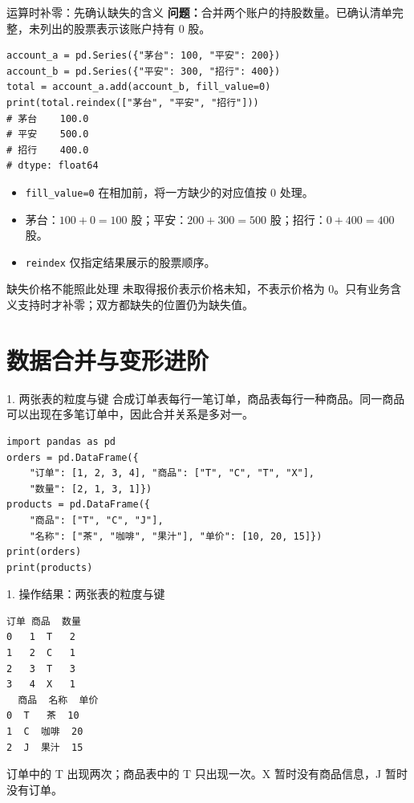 \documentclass[9pt]{ctexbeamer}
\begin{document}
\begin{frame}[fragile]{运算时补零：先确认缺失的含义}
\small \textbf{问题：}合并两个账户的持股数量。已确认清单完整，未列出的股票表示该账户持有 0 股。
\begin{lstlisting}
account_a = pd.Series({"茅台": 100, "平安": 200})
account_b = pd.Series({"平安": 300, "招行": 400})
total = account_a.add(account_b, fill_value=0)
print(total.reindex(["茅台", "平安", "招行"]))
# 茅台    100.0
# 平安    500.0
# 招行    400.0
# dtype: float64
\end{lstlisting}
\begin{itemize}
\item \texttt{fill\_value=0} 在相加前，将一方缺少的对应值按 0 处理。
\item 茅台：$100+0=100$ 股；平安：$200+300=500$ 股；招行：$0+400=400$ 股。
\item \texttt{reindex} 仅指定结果展示的股票顺序。
\end{itemize}
\begin{alertblock}{缺失价格不能照此处理}
未取得报价表示价格未知，不表示价格为 0。只有业务含义支持时才补零；双方都缺失的位置仍为缺失值。
\end{alertblock}
\end{frame}

\section{数据合并与变形进阶}
\begin{frame}[fragile]{1. 两张表的粒度与键}
\small 合成订单表每行一笔订单，商品表每行一种商品。同一商品可以出现在多笔订单中，因此合并关系是多对一。
\medskip
\begin{lstlisting}[basicstyle=\ttfamily\scriptsize]
import pandas as pd
orders = pd.DataFrame({
    "订单": [1, 2, 3, 4], "商品": ["T", "C", "T", "X"],
    "数量": [2, 1, 3, 1]})
products = pd.DataFrame({
    "商品": ["T", "C", "J"],
    "名称": ["茶", "咖啡", "果汁"], "单价": [10, 20, 15]})
print(orders)
print(products)
\end{lstlisting}
\end{frame}

\begin{frame}[fragile]{1. 操作结果：两张表的粒度与键}
\begin{lstlisting}[language={},numbers=none,basicstyle=\ttfamily\scriptsize]
   订单 商品  数量
0   1  T   2
1   2  C   1
2   3  T   3
3   4  X   1
  商品  名称  单价
0  T   茶  10
1  C  咖啡  20
2  J  果汁  15
\end{lstlisting}
\small 订单中的 T 出现两次；商品表中的 T 只出现一次。X 暂时没有商品信息，J 暂时没有订单。
\end{frame}
\end{document}

